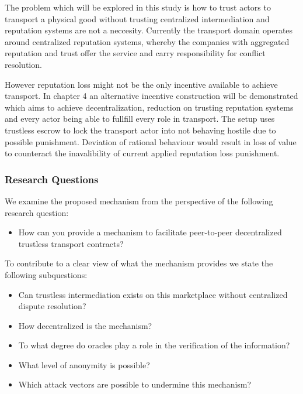 The problem which will be explored in this study is how to trust actors to transport a physical good without trusting centralized intermediation and reputation systems are not a neccesity. Currently the transport domain operates around centralized reputation systems, whereby the companies with aggregated reputation and trust offer the service and carry responsibility for conflict resolution.\par
However reputation loss might not be the only incentive available to achieve transport. In chapter 4 an alternative incentive construction will be demonstrated which aims to achieve decentralization, reduction on trusting reputation systems and every actor being able to fullfill every role in transport. The setup uses trustless escrow to lock the transport actor into not behaving hostile due to possible punishment. Deviation of rational behaviour would result in loss of value to counteract the inavalibility of current applied reputation loss punishment.

\subsubsection{Research Questions}

\bigbreak
\noindent We examine the proposed mechanism from the perspective of the following research question:
\begin{itemize}
  \item How can you provide a mechanism to facilitate peer-to-peer decentralized trustless transport contracts?
\end{itemize}
\bigbreak
\noindent To contribute to a clear view of what the mechanism provides we state the following subquestions:
\bigbreak
\begin{itemize}
  \item Can trustless intermediation exists on this marketplace without centralized dispute resolution?
  \item How decentralized is the mechanism?
  \item To what degree do oracles play a role in the verification of the information?
  \item What level of anonymity is possible?
  \item Which attack vectors are possible to undermine this mechanism?
\end{itemize}

